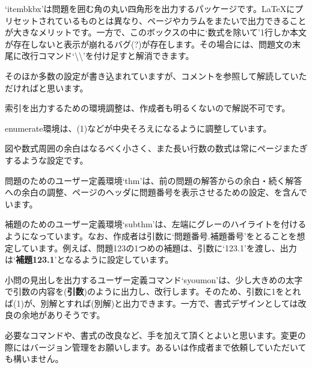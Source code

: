 \documentclass{jsarticle}
\begin{document}
`itembkbx'は問題を囲む角の丸い四角形を出力するパッケージです。\LaTeX にプリセットされているものとは異なり、ページやカラムをまたいで出力できることが大きなメリットです。一方で、このボックスの中に`数式を除いて'1行しか本文が存在しないと表示が崩れるバグ(?)が存在します。その場合には、問題文の末尾に改行コマンド`\textbackslash\textbackslash'を付け足すと解消できます。

そのほか多数の設定が書き込まれていますが、コメントを参照して解読していただければと思います。

索引を出力するための環境調整は、作成者も明るくないので解説不可です。

enumerate環境は、(1)などが中央そろえになるように調整しています。

図や数式周囲の余白はなるべく小さく、また長い行数の数式は常にページまたぎするような設定です。

問題のためのユーザー定義環境`thm'は、前の問題の解答からの余白・続く解答への余白の調整、ページのヘッダに問題番号を表示させるための設定、を含んでいます。

補題のためのユーザー定義環境`subthm'は、左端にグレーのハイライトを付けるようになっています。なお、作成者は引数に`問題番号.補題番号'をとることを想定しています。例えば、問題123の1つめの補題は、引数に`123.1'を渡し、出力は`\textbf{補題123.1}'となるように設定しています。

小問の見出しを出力するユーザー定義コマンド`syoumon'は、少し大きめの太字で引数の内容を{\large ({\bf 引数})}のように出力し、改行します。そのため、引数に1をとれば(1)が、別解とすれば(別解)と出力できます。一方で、書式デザインとしては改良の余地がありそうです。

必要なコマンドや、書式の改良など、手を加えて頂くとよいと思います。変更の際にはバージョン管理をお願いします。あるいは作成者まで依頼していただいても構いません。
\end{document}
